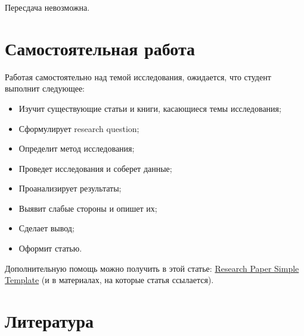 \documentclass[nobrand,anonymous,nodate,nosecurity]{huawei}
\begin{document}
Пересдача невозможна.

\section{Самостоятельная работа}

Работая самостоятельно над темой исследования, ожидается, что студент выполнит следующее:
\begin{itemize}
    \item Изучит существующие статьи и книги, касающиеся темы исследования;
    \item Сформулирует research question;
    \item Определит метод исследования;
    \item Проведет исследования и соберет данные;
    \item Проанализирует результаты;
    \item Выявит слабые стороны и опишет их;
    \item Сделает вывод;
    \item Оформит статью.
\end{itemize}

Дополнительную помощь можно получить в этой статье:
\href{https://www.yegor256.com/2022/08/24/research-paper-template.html}{Research Paper Simple Template}
(и в материалах, на которые статья ссылается).

\section{Литература}
\end{document}
